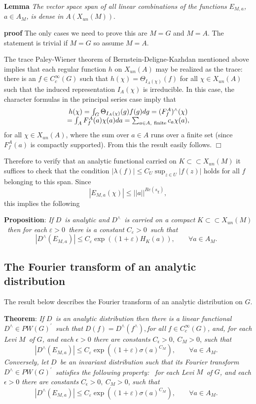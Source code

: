 {\bf Lemma} {\em The vector space span of all linear combinations of the
functions }$E_{M,a}${\em , }$a\in A_M${\em , is dense in }$A(X_{un}(M))$.

{\bf proof} The only cases we need to prove this are $M=G$ and $M=A$. The
statement is trivial if $M=G$ so assume $M=A$.

The trace Paley-Wiener theorem of Bernstein-Deligne-Kazhdan mentioned above
implies that each regular function $h$ on $X_{un}(A)$ may be realized as the
trace: there is an $f\in C_c^\infty (G)$ such that $h(\chi )=\Theta
_{I_A(\chi )}(f)$ for all $\chi \in X_{un}(A)$ such that the induced
representation $I_A(\chi )$ is irreducible. In this case, the character
formulas in the principal series case imply that 
\[
\begin{array}{c}
h(\chi )=\int_G\Theta _{I_A(\chi )}(g)f(g)dg=(F_f^A)^{\wedge }(\chi ) \\ 
=\int_AF_f^A(a)\chi (a)da=\sum_{a\in A,\ {\rm finite}} c_a\chi(a),
\end{array}
\]
for all $\chi \in X_{un}(A)$, where the sum over $a\in A$ runs over a finite
set (since $F_f^A(a)$ is compactly supported). From this the result easily
follows. $\Box $

Therefore to verify that an analytic functional carried on $K\subset \subset
X_{un}(M)$ it suffices to check that the condition $|\lambda (f)|\leq
C_U\sup _{z\in U}|f(z)|$ holds for all $f$ belonging to this span. Since 
\[
|E_{M,a}(\chi)|\leq ||a||^{Re(s_\chi)}, 
\]
this implies the following

{\bf Proposition}: {\em If }$D${\em \ is analytic and }$D^{\wedge }${\em \
is carried on a compact }$K\subset \subset X_{un}(M)${\em \ then for each }$%
\varepsilon >0${\em \ there is a constant }$C_\varepsilon >0${\em \ such that%
} 
\[
|D^{\wedge }(E_{M,a})|\leq C_\varepsilon \exp ((1+\varepsilon
)H_K(a)),\;\;\;\;\;\;\;\forall a\in A_M.\;\; 
\]

\subsection{The Fourier transform of an analytic distribution}

The result below describes the Fourier transform of an analytic distribution
on $G$.

{\bf Theorem}: {\em If }$D${\em \ is an analytic distribution then there is
  a linear functional }$D^{\wedge }\in PW(G)^{\prime }${\em \ such that}
$D(f)=D^{\wedge }(f^{\wedge }),${\em for all }$f\in C_c^\infty (G)${\em ,
  and, for each Levi }$M${\em \ of }$G${\em , and each }$\epsilon >0$
{\em there are constants }$C_\epsilon >0,\ C_M>0$, {\em such that} 
\[
|D^{\wedge }(E_{M,a})|\leq C_\varepsilon \exp ((1+\varepsilon )\sigma
(a)^{C_M}),\;\;\;\;\;\;\;\forall a\in A_M.\;\; 
\]
{\em Conversely, let }$D${\em \ be an invariant distribution such that its
Fourier transform }$D^{\wedge }\in PW(G)^{\prime }${\em \ satisfies the
  following property:} {\em \ for each Levi }$M${\em \ of }$G${\em , and each }
$\epsilon >0$ {\em there are constants }$C_\epsilon >0,\ C_M>0$, {\em such
that} 
\[
|D^{\wedge }(E_{M,a})|\leq C_\varepsilon \exp ((1+\varepsilon )\sigma
(a)^{C_M}),\;\;\;\;\;\;\;\forall a\in A_M.\;\; 
\]

